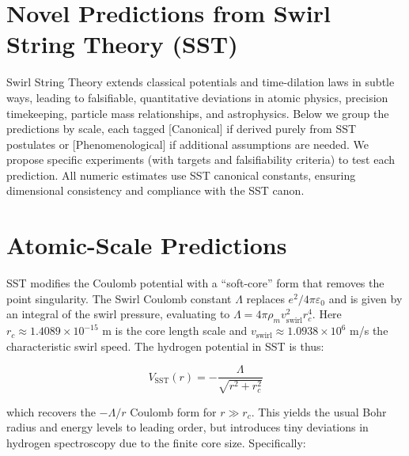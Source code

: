 \documentclass[11pt]{article}
\begin{document}
\section*{Novel Predictions from Swirl String Theory (SST)}

Swirl String Theory extends classical potentials and time-dilation laws in subtle ways, leading to falsifiable, quantitative deviations in atomic physics, precision timekeeping, particle mass relationships, and astrophysics. Below we group the predictions by scale, each tagged [Canonical] if derived purely from SST postulates or [Phenomenological] if additional assumptions are needed. We propose specific experiments (with targets and falsifiability criteria) to test each prediction. All numeric estimates use SST canonical constants, ensuring dimensional consistency and compliance with the SST canon.

\section*{Atomic-Scale Predictions}

SST modifies the Coulomb potential with a ``soft-core'' form that removes the point singularity. The Swirl Coulomb constant $\Lambda$ replaces $e^2/4\pi\varepsilon_0$ and is given by an integral of the swirl pressure, evaluating to $\Lambda = 4\pi \rho_m v_{\text{swirl}}^2 r_c^4$. Here $r_c\approx1.4089\times10^{-15}$ m is the core length scale and $v_{\text{swirl}}\approx1.0938\times10^6$ m/s the characteristic swirl speed. The hydrogen potential in SST is thus:

\begin{equation}
V_{\text{SST}}(r) = -\frac{\Lambda}{\sqrt{r^2 + r_c^2}}
\tag{Soft-core potential}
\label{V_SST}
\end{equation}

which recovers the $-\Lambda/r$ Coulomb form for $r\gg r_c$. This yields the usual Bohr radius and energy levels to leading order, but introduces tiny deviations in hydrogen spectroscopy due to the finite core size. Specifically:
\end{document}

